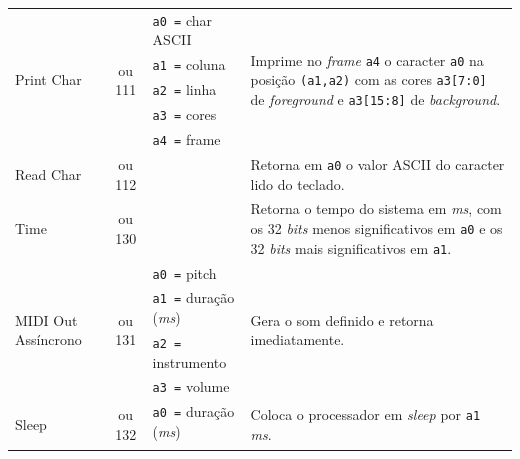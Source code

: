 \begin{longtable}{|l|c|p{3.5cm}|l |}
        \hline
        \multirow{5}{*}{Print Char}         & \multirow{5}{*}{\parbox{0.6cm}{ ou 111}}
              & \texttt{a0 =} char ASCII  & \multirow{5}{*}{\parbox{7cm}{Imprime no \textit{frame} \texttt{a4} o caracter \texttt{a0} na
                                                posição \texttt{(a1,a2)} com as cores \texttt{a3[7:0]} de \textit{foreground} e \texttt{a3[15:8]} de \textit{background}.}}\\*
            & & \texttt{a1 =} coluna      & \\*
            & & \texttt{a2 =} linha       & \\*
            & & \texttt{a3 =} cores       & \\*
            & & \texttt{a4 =} frame       & \\
        \hline
        \multirow{3}{*}{Read Char}          & \multirow{3}{*}{\parbox{0.6cm}{ ou 112}}
            &                               & \multirow{3}{*}{\parbox{7cm}{Retorna em \texttt{a0} o valor ASCII do caracter lido do teclado.}}\\*
            & & & \\*
            & & & \\
        \hline
        \multirow{3}{*}{Time}               & \multirow{3}{*}{\parbox{0.6cm}{ ou 130}}
            &                               & \multirow{3}{*}{\parbox{7cm}{Retorna o tempo do sistema em \textit{ms}, com os 32 \textit{bits} menos significativos em \texttt{a0}
                                                e os 32 \textit{bits} mais significativos em \texttt{a1}.}}\\*
            & & & \\*
            & & & \\
        \hline
        \multirow{4}{*}{MIDI Out Assíncrono }   & \multirow{4}{*}{\parbox{0.6cm}{ ou 131}}
              & \texttt{a0 =} pitch       & \multirow{4}{*}{\parbox{7cm}{Gera o som definido e retorna imediatamente.}}\\*
            & & \texttt{a1 =} duração (\textit{ms}) & \\*
            & & \texttt{a2 =} instrumento & \\*
            & & \texttt{a3 =} volume      & \\
        \hline
        \multirow{3}{*}{Sleep}              & \multirow{3}{*}{\parbox{0.6cm}{ ou 132}}
            & \texttt{a0 =} duração (\textit{ms}) & \multirow{3}{*}{\parbox{7cm}{Coloca o processador em \textit{sleep} por \texttt{a1} \textit{ms}.}}\\*

\end{longtable}
